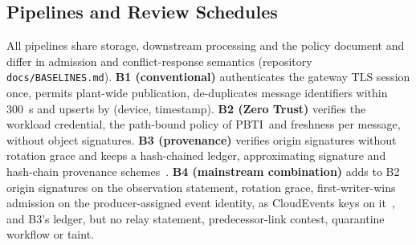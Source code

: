 \documentclass[futureinternet,article,submit,moreauthors]{Definitions/mdpi}
\newcommand{\sys}{PBTI}
\begin{document}
\subsection{Pipelines and Review Schedules}\label{sec:pipelines}

All pipelines share storage, downstream processing and the policy document and differ in admission and conflict-response semantics (repository \texttt{docs/BASELINES.md}). \textbf{B1 (conventional)} authenticates the gateway TLS session once, permits plant-wide publication, de-duplicates message identifiers within 300~s and upserts by (device, timestamp). \textbf{B2 (Zero Trust)} verifies the workload credential, the path-bound policy of \sys\ and freshness per message, without object signatures. \textbf{B3 (provenance)} verifies origin signatures without rotation grace and keeps a hash-chained ledger, approximating signature and hash-chain provenance schemes~\cite{hasan2009tos,javaid2018blockpro,sigwart2019bcprov}. \textbf{B4 (mainstream combination)} adds to B2 origin signatures on the observation statement, rotation grace, first-writer-wins admission on the producer-assigned event identity, as CloudEvents keys on it~\cite{cloudevents102}, and B3's ledger, but no relay statement, predecessor-link contest, quarantine workflow or taint.
\end{document}
